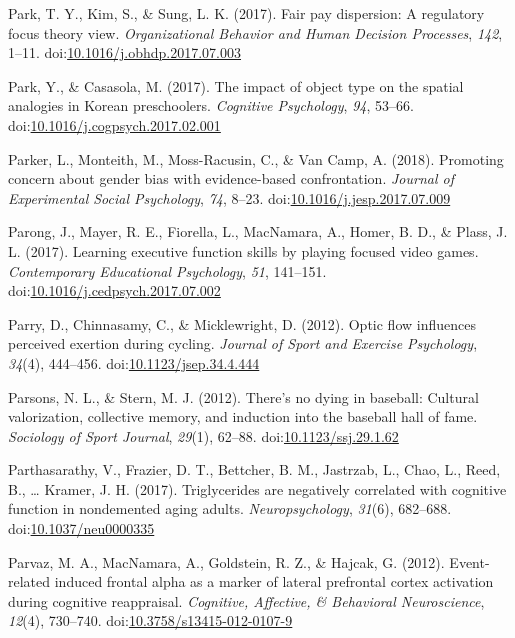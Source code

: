 \documentclass[english,man]{apa6}
\theoremstyle{definition}
\theoremstyle{definition}
\theoremstyle{definition}
\theoremstyle{remark}
\begin{document}
\hypertarget{ref-Park2017}{}
Park, T. Y., Kim, S., \& Sung, L. K. (2017). Fair pay dispersion: A
regulatory focus theory view. \emph{Organizational Behavior and Human
Decision Processes}, \emph{142}, 1--11.
doi:\href{https://doi.org/10.1016/j.obhdp.2017.07.003}{10.1016/j.obhdp.2017.07.003}

\hypertarget{ref-Park2017a}{}
Park, Y., \& Casasola, M. (2017). The impact of object type on the
spatial analogies in Korean preschoolers. \emph{Cognitive Psychology},
\emph{94}, 53--66.
doi:\href{https://doi.org/10.1016/j.cogpsych.2017.02.001}{10.1016/j.cogpsych.2017.02.001}

\hypertarget{ref-Parker2018}{}
Parker, L., Monteith, M., Moss-Racusin, C., \& Van Camp, A. (2018).
Promoting concern about gender bias with evidence-based confrontation.
\emph{Journal of Experimental Social Psychology}, \emph{74}, 8--23.
doi:\href{https://doi.org/10.1016/j.jesp.2017.07.009}{10.1016/j.jesp.2017.07.009}

\hypertarget{ref-Parong2017}{}
Parong, J., Mayer, R. E., Fiorella, L., MacNamara, A., Homer, B. D., \&
Plass, J. L. (2017). Learning executive function skills by playing
focused video games. \emph{Contemporary Educational Psychology},
\emph{51}, 141--151.
doi:\href{https://doi.org/10.1016/j.cedpsych.2017.07.002}{10.1016/j.cedpsych.2017.07.002}

\hypertarget{ref-Parry2012}{}
Parry, D., Chinnasamy, C., \& Micklewright, D. (2012). Optic flow
influences perceived exertion during cycling. \emph{Journal of Sport and
Exercise Psychology}, \emph{34}(4), 444--456.
doi:\href{https://doi.org/10.1123/jsep.34.4.444}{10.1123/jsep.34.4.444}

\hypertarget{ref-Parsons2012}{}
Parsons, N. L., \& Stern, M. J. (2012). There's no dying in baseball:
Cultural valorization, collective memory, and induction into the
baseball hall of fame. \emph{Sociology of Sport Journal}, \emph{29}(1),
62--88.
doi:\href{https://doi.org/10.1123/ssj.29.1.62}{10.1123/ssj.29.1.62}

\hypertarget{ref-Parthasarathy2017}{}
Parthasarathy, V., Frazier, D. T., Bettcher, B. M., Jastrzab, L., Chao,
L., Reed, B., \ldots{} Kramer, J. H. (2017). Triglycerides are
negatively correlated with cognitive function in nondemented aging
adults. \emph{Neuropsychology}, \emph{31}(6), 682--688.
doi:\href{https://doi.org/10.1037/neu0000335}{10.1037/neu0000335}

\hypertarget{ref-Parvaz2012}{}
Parvaz, M. A., MacNamara, A., Goldstein, R. Z., \& Hajcak, G. (2012).
Event-related induced frontal alpha as a marker of lateral prefrontal
cortex activation during cognitive reappraisal. \emph{Cognitive,
Affective, \& Behavioral Neuroscience}, \emph{12}(4), 730--740.
doi:\href{https://doi.org/10.3758/s13415-012-0107-9}{10.3758/s13415-012-0107-9}
\end{document}
